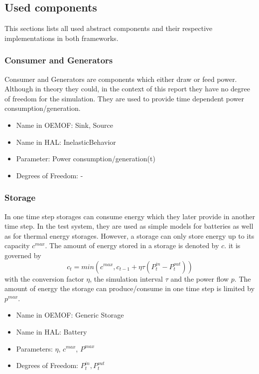 \documentclass[a4paper,12pt]{book}
\theoremstyle{break}
\begin{document}
\subsection{Used components}\label{s/meth/comp/components}
This sections lists all used abstract components and their respective implementations in both frameworks.

\subsubsection{Consumer and Generators}
Consumer and Generators are components which either draw or feed power.
Although in theory they could, in the context of this report they have no degree of freedom for the simulation.
They are used to provide time dependent power consumption/generation.

\begin{itemize}
	\item Name in \ac{OEMOF}: Sink, Source
	\item Name in HAL: InelasticBehavior
	\item Parameter: Power consumption/generation(t)
	\item Degrees of Freedom: -
\end{itemize}


\subsubsection{Storage}
In one time step storages can consume energy which they later provide in another time step. 
In the test system, they are used as simple models for batteries as well as for thermal energy storages.
However, a storage can only store energy up to its capacity $c^{max}$.
The amount of energy stored in a storage is denoted by $c$.
it is governed by
\begin{equation}
	c_t = min(c^{max}, c_{t-1} + \eta \tau (P_t^{in} - P_t^{out})) 
\end{equation} with the conversion factor $\eta$, the simulation interval $\tau$ and the power flow $p$.
The amount of energy the storage can produce/consume in one time step is limited by $p^{max}$.

\begin{itemize}
	\item Name in \ac{OEMOF}: Generic Storage
	\item Name in HAL: Battery
	\item Parameters: $\eta$, $c^{max}$, $P^{max}$
	\item Degrees of Freedom: $P_t^{in}, P_t^{out}$
\end{itemize}
\end{document}
